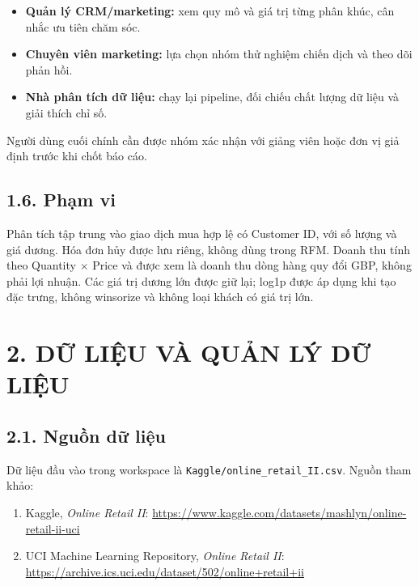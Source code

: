 \documentclass[a4paper]{article}
\begin{document}
\begin{itemize}
\item \textbf{Quản lý CRM/marketing:} xem quy mô và giá trị từng phân khúc, cân nhắc ưu tiên chăm sóc.
\item \textbf{Chuyên viên marketing:} lựa chọn nhóm thử nghiệm chiến dịch và theo dõi phản hồi.
\item \textbf{Nhà phân tích dữ liệu:} chạy lại pipeline, đối chiếu chất lượng dữ liệu và giải thích chỉ số.
\end{itemize}

Người dùng cuối chính cần được nhóm xác nhận với giảng viên hoặc đơn vị giả định trước khi chốt báo cáo.

\subsection*{1.6. Phạm vi}

Phân tích tập trung vào giao dịch mua hợp lệ có Customer ID, với số lượng và giá dương. Hóa đơn hủy được lưu riêng, không dùng trong RFM. Doanh thu tính theo Quantity \ensuremath{\times} Price và được xem là doanh thu dòng hàng quy đổi GBP, không phải lợi nhuận. Các giá trị dương lớn được giữ lại; log1p được áp dụng khi tạo đặc trưng, không winsorize và không loại khách có giá trị lớn.


\section*{2. DỮ LIỆU VÀ QUẢN LÝ DỮ LIỆU}

\subsection*{2.1. Nguồn dữ liệu}

Dữ liệu đầu vào trong workspace là \texttt{Kaggle/online\_retail\_II.csv}. Nguồn tham khảo:

\begin{enumerate}
\item Kaggle, \textit{Online Retail II}: \url{https://www.kaggle.com/datasets/mashlyn/online-retail-ii-uci}
\item UCI Machine Learning Repository, \textit{Online Retail II}: \url{https://archive.ics.uci.edu/dataset/502/online+retail+ii}
\end{enumerate}
\end{document}
